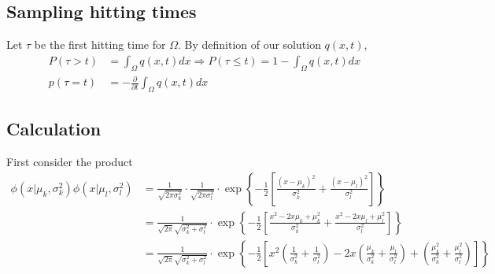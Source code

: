 \documentclass[10pt]{article}
\begin{document}
\subsection{Sampling hitting times}
Let $\tau$ be the first hitting time for $\Omega$. By definition of our solution $q(x,t)$,
\begin{align*}
  P(\tau > t) &= \int_\Omega q(x,t) dx \Rightarrow P(\tau \leq t) = 1 - \int_\Omega q(x,t) dx \\
  p(\tau = t) &= -\frac{\partial}{\partial t}\int_\Omega q(x,t) dx
\end{align*}

\begin{appendices}
  \section{Calculation}
  First consider the product
  \begin{align*}
    \phi(x|\mu_k, \sigma^2_k)
    \phi(x|\mu_l, \sigma^2_l) &= \frac{1}{\sqrt{2\pi \sigma^2_k}} \cdot
                                \frac{1}{\sqrt{2\pi \sigma^2_l}} \cdot
                                \exp\left\{-\frac{1}{2}\left[
                                \frac{(x-\mu_k)^2}{\sigma_k^2} +
                                \frac{(x-\mu_l)^2}{\sigma_l^2}
                                \right] \right\} \\
                              &=  \frac{1}{\sqrt{2\pi}
                                \sqrt{\sigma^2_k+\sigma^2_l}} \cdot
                                \exp\left\{-\frac{1}{2}\left[
                                \frac{x^2 - 2x\mu_k + \mu_k^2}{\sigma^2_k}
                                +
                                \frac{x^2 - 2x\mu_l + \mu_l^2}{\sigma^2_l}
                                \right] \right\} \\
                              &= \frac{1}{\sqrt{2\pi}
                                \sqrt{\sigma^2_k+\sigma^2_l}} \cdot
                                \exp\left\{-\frac{1}{2}\left[
                                x^2\left(\frac{1}{\sigma^2_k} +
                                \frac{1}{\sigma_l^2}\right) -
                                2x\left(\frac{\mu_k}{\sigma^2_k} +
                                \frac{\mu_l}{\sigma^2_l}\right)
                                +
                                \left(\frac{\mu_k^2}{\sigma_k^2} +
                                \frac{\mu_l^2}{\sigma^2_l}\right)
                                \right] \right\} \\

\end{align*}
\end{appendices}
\end{document}
